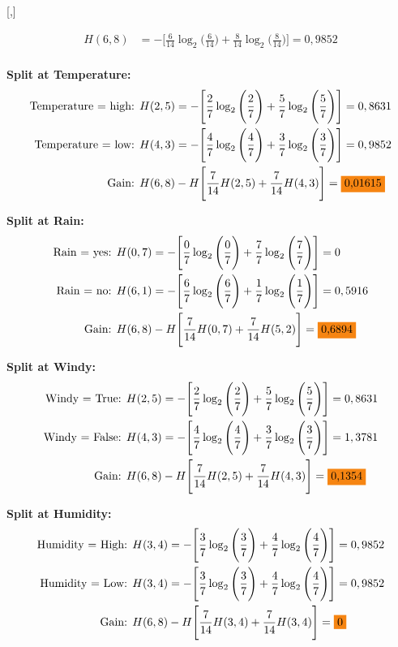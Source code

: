 \documentclass{article}
\begin{document}
[,]

\begin{align*}
    H(6,8) &= -\Bigg[\frac{6}{14} \log_2\Bigg(\frac{6}{14}\Bigg) + \frac{8}{14} \log_2\Bigg(\frac{8}{14}\Bigg)\Bigg] = 0,9852\\
\end{align*}

\textbf{Split at Temperature:}
\begin{align*}
    \text{Temperature = high: } &H(2,5) = -\Bigg[\frac{2}{7} \log_2\Bigg(\frac{2}{7}\Bigg) + \frac{5}{7} \log_2\Bigg(\frac{5}{7}\Bigg)\Bigg] = 0,8631\\
    \text{Temperature = low: } &H(4,3) = -\Bigg[\frac{4}{7} \log_2\Bigg(\frac{4}{7}\Bigg) + \frac{3}{7} \log_2\Bigg(\frac{3}{7}\Bigg)\Bigg] = 0,9852\\
    \text{Gain: } &H(6,8) - H\Bigg[\frac{7}{14} H(2,5) + \frac{7}{14} H(4,3)\Bigg] = \text{\colorbox{BurntOrange}{0,01615}}
\end{align*}

\textbf{Split at Rain:}
\begin{align*}
    \text{Rain = yes: } &H(0,7) = -\Bigg[\frac{0}{7} \log_2\Bigg(\frac{0}{7}\Bigg) + \frac{7}{7} \log_2\Bigg(\frac{7}{7}\Bigg)\Bigg] = 0\\
    \text{Rain = no: } &H(6,1) = -\Bigg[\frac{6}{7} \log_2\Bigg(\frac{6}{7}\Bigg) + \frac{1}{7} \log_2\Bigg(\frac{1}{7}\Bigg)\Bigg] = 0,5916\\
    \text{Gain: } &H(6,8) - H\Bigg[\frac{7}{14} H(0,7) + \frac{7}{14} H(5,2)\Bigg] = \text{\colorbox{BurntOrange}{0,6894}}
\end{align*}

\textbf{Split at Windy:}
\begin{align*}
    \text{Windy = True: } &H(2,5) = -\Bigg[\frac{2}{7} \log_2\Bigg(\frac{2}{7}\Bigg) + \frac{5}{7} \log_2\Bigg(\frac{5}{7}\Bigg)\Bigg] = 0,8631\\
    \text{Windy = False: } &H(4,3) = -\Bigg[\frac{4}{7} \log_2\Bigg(\frac{4}{7}\Bigg) + \frac{3}{7} \log_2\Bigg(\frac{3}{7}\Bigg)\Bigg] = 1,3781\\
    \text{Gain: } &H(6,8) - H\Bigg[\frac{7}{14} H(2,5) + \frac{7}{14} H(4,3)\Bigg] = \text{\colorbox{BurntOrange}{0,1354}}
\end{align*}

\textbf{Split at Humidity:}
\begin{align*}
    \text{Humidity = High: } &H(3,4) = -\Bigg[\frac{3}{7} \log_2\Bigg(\frac{3}{7}\Bigg) + \frac{4}{7} \log_2\Bigg(\frac{4}{7}\Bigg)\Bigg] = 0,9852\\
    \text{Humidity = Low: } &H(3,4) = -\Bigg[\frac{3}{7} \log_2\Bigg(\frac{3}{7}\Bigg) + \frac{4}{7} \log_2\Bigg(\frac{4}{7}\Bigg)\Bigg] = 0,9852\\
    \text{Gain: } &H(6,8) - H\Bigg[\frac{7}{14} H(3,4) + \frac{7}{14} H(3,4)\Bigg] = \text{\colorbox{BurntOrange}{0}}
\end{align*}
\end{document}
